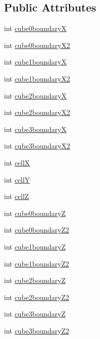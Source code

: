 \subsection*{Public Attributes}
\begin{DoxyCompactItemize}
\item 
int \hyperlink{classt_shape_a2df1bbbd7e785bd17cd4d63e8b3a6869}{cube0boundary\-X}
\item 
int \hyperlink{classt_shape_ac4ca3540f5d00586160f68272f60b060}{cube0boundary\-X2}
\item 
int \hyperlink{classt_shape_a5b7cbdbe623f5a877f84b82b70b5dbbb}{cube1boundary\-X}
\item 
int \hyperlink{classt_shape_afc1aab26cc9f3f2469d8080d3f4db30b}{cube1boundary\-X2}
\item 
int \hyperlink{classt_shape_a7cdc58c460ed0ff531971184532e4964}{cube2boundary\-X}
\item 
int \hyperlink{classt_shape_ad3e402834a2d3c1b95d171a0108c8716}{cube2boundary\-X2}
\item 
int \hyperlink{classt_shape_aa1aac01762ff03d22030cb0ed99189f6}{cube3boundary\-X}
\item 
int \hyperlink{classt_shape_a4c6aff9cf7e8fcc0b0fa8d8a0312f83c}{cube3boundary\-X2}
\item 
int \hyperlink{classt_shape_afe93811926d8189ec7a05f3837946d13}{cell\-X}
\item 
int \hyperlink{classt_shape_ac6f6ca34dbe77edc42bf1063f45704f3}{cell\-Y}
\item 
int \hyperlink{classt_shape_a472e4925e0aaa875df22dab7a6ed3551}{cell\-Z}
\item 
int \hyperlink{classt_shape_a6c726e8afc0847cea65901b74bb0f1a4}{cube0boundary\-Z}
\item 
int \hyperlink{classt_shape_ab587a6654689689ee6b94d10f6105082}{cube0boundary\-Z2}
\item 
int \hyperlink{classt_shape_ae1d93af37253f5dd2e59b35366fdd8ef}{cube1boundary\-Z}
\item 
int \hyperlink{classt_shape_af5ef08112c5ac489c6ab89a445563cbd}{cube1boundary\-Z2}
\item 
int \hyperlink{classt_shape_a16bd5d07b91ee4e24e6344c9241d8f95}{cube2boundary\-Z}
\item 
int \hyperlink{classt_shape_a6c6d6c35143aaa266ff75b76f41e38bc}{cube2boundary\-Z2}
\item 
int \hyperlink{classt_shape_a08534f9b32ceebaa5ca648d30a003d6f}{cube3boundary\-Z}
\item 
int \hyperlink{classt_shape_ac0932463ccf31060b93109584e7b142c}{cube3boundary\-Z2}

\end{DoxyCompactItemize}
